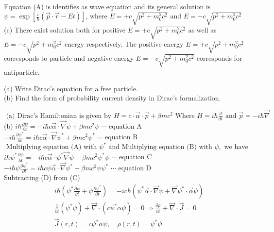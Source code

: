 \begin{enumerate}
\begin{answer}
\begin{align*}
\end{align*}
Equation (A) is identifies as wave equation and its general solution is $\psi=\exp \left[\frac{i}{\hbar}(\vec{p} \cdot \vec{r}-E t)\right]$, where $E=+c \sqrt{p^{2}+m_{0}^{2} c^{2}}$ and $E=-c \sqrt{p^{2}+m_{0}^{2} c^{2}}$\\
(c) There exist solution both for positive $E=+c \sqrt{p^{2}+m_{0}^{2} c^{2}}$ as well as $E=-c \sqrt{p^{2}+m_{0}^{2} c^{2}}$ energy respectively. The positive energy $E=+c \sqrt{p^{2}+m_{0}^{2} c^{2}}$ corresponds to particle and negative energy $E=-c \sqrt{p^{2}+m_{0}^{2} c^{2}}$ corresponds for antiparticle.
\end{answer}
	\begin{minipage}{\textwidth}
	\item (a) Write Dirac's equation for a free particle.\\
	(b) Find the form of probability current density in Dirac's formalization.
\end{minipage}
\begin{answer}
	$\text { (a) Dirac's Hamiltonian is given by } H=c \cdot \vec{\alpha} \cdot \vec{p}+\beta m c^{2} \text { Where } H=i \hbar \frac{d}{d t} \text { and } \vec{p}=-i \hbar \vec{\nabla}$\\
	(b) $i \hbar \frac{\partial \psi}{\partial t}=-i \hbar c \vec{\alpha} \cdot \vec{\nabla} \psi+\beta m c^{2} \psi$ $\cdots$ equation A\\
	$-i \hbar \frac{\partial \psi^{*}}{\partial t}=i \hbar c \vec{\alpha} \cdot \vec{\nabla} \psi^{*}+\beta m c^{2} \psi^{*}$ $\cdots$ equation B\\
	$\text { Multiplying equation (A) with } \psi^{*} \text { and Multiplying equation (B) with } \psi, \text { we have }$\\
		$i \hbar \psi^{*} \frac{\partial \psi}{\partial t}=-i \hbar c \vec{\alpha} \cdot \psi^{*} \vec{\nabla} \psi+\beta m c^{2} \psi^{*} \psi$ $\cdots$ equation C\\
		$-i \hbar \psi \frac{\partial \psi^{*}}{\partial t}=i \hbar c \psi \vec{\alpha} \cdot \vec{\nabla} \psi^{*}+\beta m c^{2} \psi \psi^{*}$ $\cdots$ equation D\\
		Subtracting (D) from (C)
		\begin{align*}
		&i \hbar\left(\psi^{*} \frac{\partial \psi}{\partial t}+\psi \frac{\partial \psi^{*}}{\partial t}\right)=-i c \hbar\left(\psi^{*} \vec{\alpha} \cdot \vec{\nabla} \psi+\vec{\nabla} \psi^{*} \cdot \vec{\alpha} \psi\right) \\
		&\frac{\partial}{\partial t}\left(\psi^{*} \psi\right)+\vec{\nabla} \cdot\left(c \psi^{*} \alpha \psi\right)=0 \Rightarrow \frac{\partial \rho}{\partial t}+\vec{\nabla} \cdot \vec{J}=0 \\
		&\vec{J}(r, t)=c \psi^{*} \alpha \psi, \quad \rho(r, t)=\psi^{*} \psi
		\end{align*}
\end{answer}
\end{enumerate}